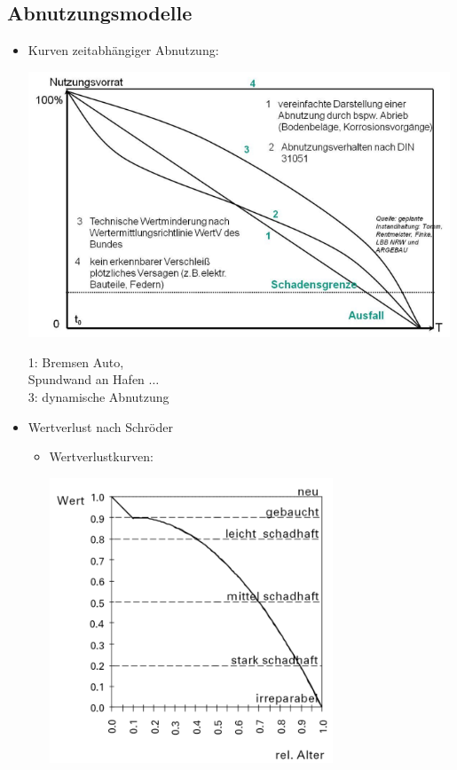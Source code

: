 \documentclass[fleqn,twoside,dvipsnames]{article}
\begin{document}
    \subsection{Abnutzungsmodelle}
        \begin{itemize}
            \item Kurven zeitabhängiger Abnutzung:\\
                \begin{minipage}{0.7\textwidth}
                \includegraphics[width=0.99\textwidth]{Grafiken/Verfahren zur Bestimmung von Bauteillebensdauern/Kurven zeitabhaengiger Abnutzung.png}
                \end{minipage}
                \begin{minipage}{0.25\textwidth}
                1: Bremsen Auto, \\ Spundwand an Hafen $\dots$ \\ 3: dynamische Abnutzung
                \end{minipage}
            \item Wertverlust nach Schröder
                \begin{itemize}
                    \item Wertverlustkurven:\\
                        \begin{minipage}{0.4\textwidth}
                        \includegraphics[width=0.7\textwidth]{Grafiken/Verfahren zur Bestimmung von Bauteillebensdauern/Wertverlustkurven - Wertverlust nach Schroeder.png}

\end{minipage}
\end{itemize}
\end{itemize}
\end{document}
